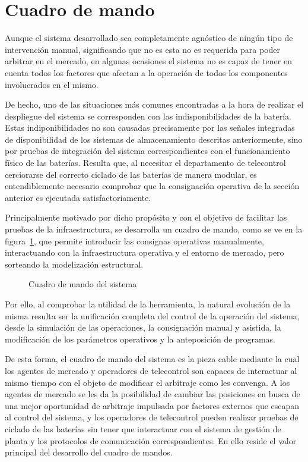 \section{Cuadro de mando}
\label{makereference6.2}

Aunque el sistema desarrollado sea completamente agnóstico de ningún tipo de intervención manual, significando que no es esta no es requerida para poder arbitrar en el mercado, en algunas ocasiones el sistema no es capaz de tener en cuenta todos los factores que afectan a la operación de todos los componentes involucrados en el mismo.

De hecho, uno de las situaciones más comunes encontradas a la hora de realizar el despliegue del sistema se corresponden con las indisponibilidades de la batería. Estas indiponibilidades no son causadas precisamente por las señales integradas de disponibilidad de los sistemas de almacenamiento descritas anteriormente, sino por pruebas de integración del sistema correspondientes con el funcionamiento físico de las baterías. Resulta que, al necesitar el departamento de telecontrol cerciorarse del correcto ciclado de las baterías de manera modular, es entendiblemente necesario comprobar que la consignación operativa de la sección anterior es ejecutada satisfactoriamente.

Principalmente motivado por dicho propósito y con el objetivo de facilitar las pruebas de la infraestructura, se desarrolla un cuadro de mando, como se ve en la figura~\ref{fig:cuadro-de-mando}, que permite introducir las consignas operativas manualmente, interactuando con la infraestructura operativa y el entorno de mercado, pero sorteando la modelización  estructural.

\begin{figure}
  \centering
  \caption{Cuadro de mando del sistema}
  \label{fig:cuadro-de-mando}
\end{figure}

Por ello, al comprobar la utilidad de la herramienta, la natural evolución de la misma resulta ser la unificación completa del control de la operación del sistema, desde la simulación de las operaciones, la consignación manual y asistida, la modificación de los parámetros operativos y la anteposición de programas.

De esta forma, el cuadro de mando del sistema es la pieza cable mediante la cual los agentes de mercado y operadores de telecontrol son capaces de interactuar al mismo tiempo con el objeto de modificar el arbitraje como les convenga. A los agentes de mercado se les da la posibilidad de cambiar las posiciones en busca de una mejor oportunidad de arbitraje impulsada por factores externos que escapan al control del sistema, y los operadores de telecontrol pueden realizar pruebas de ciclado de las baterías sin tener que interactuar con el sistema de gestión de planta y los protocolos de comunicación correspondientes. En ello reside el valor principal del desarrollo del cuadro de mandos.

